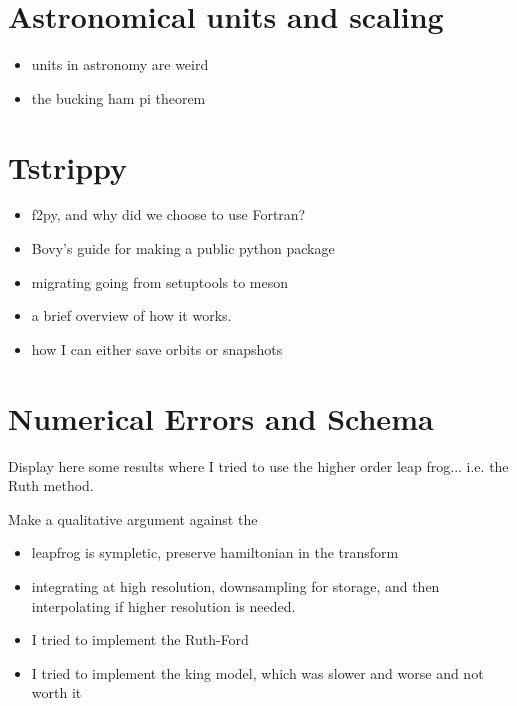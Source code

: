 \section{Astronomical units and scaling}
    \begin{itemize}
    \item units in astronomy are weird
    \item the bucking ham pi theorem 
    \end{itemize}



\section{Tstrippy}

    \begin{itemize}
        \item f2py, and why did we choose to use Fortran? 
        \item Bovy's guide for making a public python package
        \item migrating going from setuptools to meson
        \item a brief overview of how it works. 
        \item how I can either save orbits or snapshots
    \end{itemize}



\section{Numerical Errors and Schema} 
    Display here some results where I tried to use the higher order leap frog... i.e. the Ruth method. 

    Make a qualitative argument against the 

    \begin{itemize}
        \item leapfrog is sympletic, preserve hamiltonian in the transform
        \item integrating at high resolution, downsampling for storage, and then interpolating if higher resolution is needed. 
        \item I tried to implement the Ruth-Ford
        \item I tried to implement the king model, which was slower and worse and not worth it 
    \end{itemize}




